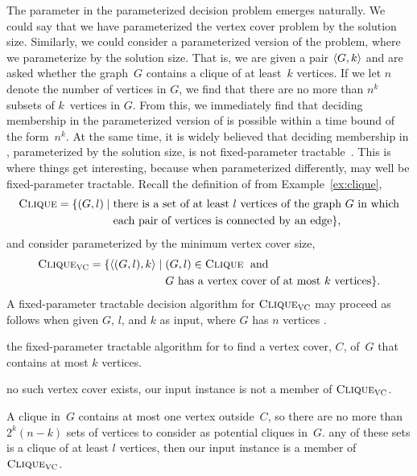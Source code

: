 The parameter in the parameterized decision problem  emerges naturally.
We could say that we have parameterized the vertex cover problem by the solution size.
Similarly, we could consider a parameterized version of the  problem, where we parameterize by the solution size.
That is, we are given a pair ${\langle G, k\rangle}$ and are asked whether the graph~$G$ contains a clique of at least~$k$ vertices.
If we let $n$ denote the number of vertices in $G$, we find that there are no more than $n^k$ subsets of $k$~vertices in $G$.
From this, we immediately find that deciding membership in the parameterized version of  is possible within a time bound of the form~$n^k$.
At the same time, it is widely believed that deciding membership in , parameterized by the solution size, is not fixed-parameter tractable~\parencite{downey1999parameterized,cygan2015parameterized}.
This is where things get interesting, because when parameterized differently,  may well be fixed-parameter tractable.
Recall the definition of  from Example~\ref{ex:clique},
\begin{align*}
  \textnormal{\textsc{Clique}} = \{(G, l) \;|\; &\text{there is a set of at least $l$ vertices of the graph $G$ in which} \\
  	&\text{each pair of vertices is connected by an edge}\},
\end{align*}
and consider  parameterized by the minimum vertex cover size,
\begin{align*}
  \textnormal{\textsc{Clique}}_{\textnormal{\textsc{VC}}} = \{{\langle (G, l), k\rangle} \;|\; &(G, l) \in \textnormal{\textsc{Clique}} \;\text{ and }\; \\
  	&\text{$G$ has a vertex cover of at most $k$ vertices}\}.
\end{align*}
A fixed-parameter tractable decision algorithm for $\textnormal{\textsc{Clique}}_{\textnormal{\textsc{VC}}}$ may proceed as follows when given $G$, $l$, and $k$ as input, where $G$ has $n$ vertices \parencite[Section~15.2.4]{cygan2015parameterized}.
\begin{codelisting}
\item
   the fixed-parameter tractable algorithm for  to find a vertex cover, $C$, of~$G$ that contains at most $k$ vertices.
\item
   no such vertex cover exists, our input instance is not a member of $\pr{Clique}_\pr{VC}$.
\item
  A clique in~$G$ contains at most one vertex outside~$C$, so there are no more than $2^k (n - k)$ sets of vertices to consider as potential cliques in~$G$.
   any of these sets is a clique of at least $l$ vertices, then our input instance is a member of $\pr{Clique}_\pr{VC}$.
\end{codelisting}

